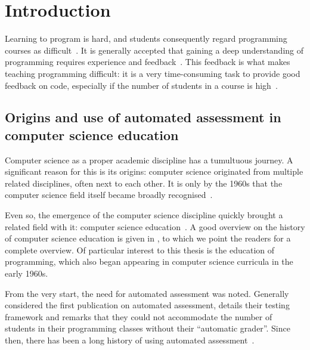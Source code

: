 \documentclass[./main]{subfiles}
\begin{document}
\chapter{Introduction}\label{ch:introduction}

Learning to program is hard, and students consequently regard programming courses as difficult~\autocite{robinsLearningTeachingProgramming2003,simoesNatureProgrammingExercises2020}.
It is generally accepted that gaining a deep understanding of programming requires experience and feedback~\autocite{gomesEnvironmentImproveProgramming2007}.
This feedback is what makes teaching programming difficult: it is a very time-consuming task to provide good feedback on code, especially if the number of students in a course is high~\autocite{zavalaUseSemanticbasedAIG2018,staubitzRepositoryOpenAutogradable2017,queirosPexilProgrammingExercises2011,pirttinenCrowdsourcingProgrammingAssignments2018,gulwaniFeedbackGenerationPerformance2014,tangDatadrivenTestCase2016}.

\section{Origins and use of automated assessment in computer science education}\label{sec:automated-assessment-in-computer-science-education}

Computer science as a proper academic discipline has a tumultuous journey.
A significant reason for this is its origins: computer science originated from multiple related disciplines, often next to each other.
It is only by the 1960s that the computer science field itself became broadly recognised~\autocite{hopcroftComputerScienceEmergence1987,atchisonComputerScienceNew1971,gornComputerInformationSciences1963,knuthComputerScienceIts1974,denningScienceComputerScience2013,denningScienceComputerScience2013}.

Even so, the emergence of the computer science discipline quickly brought a related field with it: computer science education~\autocite{simonEmergenceComputingEducation2015}.
A good overview on the history of computer science education is given in \textcite{tedreChangingAimsComputing2018}, to which we point the readers for a complete overview.
Of particular interest to this thesis is the education of programming, which also began appearing in computer science curricula in the early 1960s.

From the very start, the need for automated assessment was noted.
Generally considered the first publication on automated assessment, \textcite{hollingsworthAutomaticGradersProgramming1960} details their testing framework and remarks that they could not accommodate the number of students in their programming classes without their ``automatic grader''.
Since then, there has been a long history of using automated assessment~\autocite{ala-mutkaSurveyAutomatedAssessment2005,douceAutomaticTestbasedAssessment2005,ihantolaReviewRecentSystems2010,paivaAutomatedAssessmentComputer2022,combefisAutomatedCodeAssessment2022,nayakAutomatedAssessmentTools2022,messerAutomatedGradingFeedback2024}.
\end{document}
